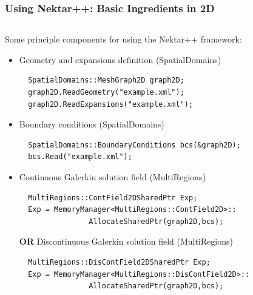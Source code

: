 \documentclass{beamer}
\numberwithin{figure}{section}
\numberwithin{equation}{section}
\begin{document}
\begin{frame}[fragile]
\frametitle{Using Nektar++: Basic Ingredients in 2D}
\begin{minipage}[c][0.8\textheight][t]{\linewidth}
\begin{columns}
\begin{column}[l]{11.5cm}
Some principle components for using the Nektar++ framework:
\begin{itemize}
  \item Geometry and expansions definition (SpatialDomains)
  \begin{lstlisting}
  SpatialDomains::MeshGraph2D graph2D;
  graph2D.ReadGeometry("example.xml");
  graph2D.ReadExpansions("example.xml");
  \end{lstlisting}
  \item Boundary conditions (SpatialDomains)
  \begin{lstlisting}
  SpatialDomains::BoundaryConditions bcs(&graph2D);
  bcs.Read("example.xml");
  \end{lstlisting}
  \item Continuous Galerkin solution field (MultiRegions)
  \begin{lstlisting}
  MultiRegions::ContField2DSharedPtr Exp;
  Exp = MemoryManager<MultiRegions::ContField2D>::
                AllocateSharedPtr(graph2D,bcs);
  \end{lstlisting}
  \textbf{OR} Discontinuous Galerkin solution field (MultiRegions)
  \begin{lstlisting}
  MultiRegions::DisContField2DSharedPtr Exp;
  Exp = MemoryManager<MultiRegions::DisContField2D>::
                AllocateSharedPtr(graph2D,bcs);
  \end{lstlisting}
\end{itemize}
\end{column}
\end{columns}
\end{minipage}
\end{frame}

\end{document}
